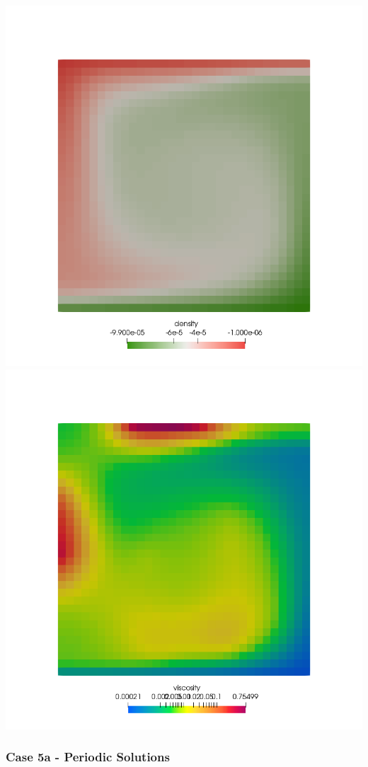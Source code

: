 \begin{center}
\includegraphics[width=7.cm]{python_codes/fieldstone_28/results_case4/rho}
\includegraphics[width=7.cm]{python_codes/fieldstone_28/results_case4/mueff}
\end{center}

\newpage %
\subsubsection*{Case 5a - Periodic Solutions}

